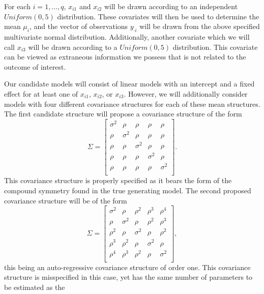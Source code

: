 		For each $i = 1,...,q$, $x_{i1}$ and $x_{i2}$ will be drawn according to an independent $Uniform(0,5)$ distribution. These covariates will then be used to determine the mean
		$\mu_i$, and the vector of observations $y_{\cdot i}$ will be drawn from the above specified multivariate normal distribution. Additionally, another covariate which we will
		call $x_{i3}$ will be drawn according to a $Uniform(0,5)$ distribution. This covariate can be viewed as extraneous information we possess that is not related to the outcome of
		interest. 

		Our candidate models will consist of linear models with an intercept and a fixed effect for at least one of $x_{i1}$, $x_{i2}$, or $x_{i3}$. However, we will additionally consider models
		with four different covariance structures for each of these mean structures. The first candidate structure will propose a covariance structure of the form
		\begin{equation}
			\Sigma = 
			\begin{bmatrix}
				\sigma^2 & \rho & \rho & \rho & \rho \\
				\rho & \sigma^2 & \rho & \rho & \rho \\
				\rho & \rho & \sigma^2 & \rho & \rho \\
				\rho & \rho & \rho & \sigma^2 & \rho \\
				\rho & \rho & \rho & \rho & \sigma^2 \\
			\end{bmatrix}
			.
		\end{equation}
		This covariance structure is properly specified as it bears the form of the compound symmetry found in the true generating model. The second proposed covariance structure will be
		of the form
		\begin{equation}
			\Sigma = 
			\begin{bmatrix}
				\sigma^2 & \rho & \rho^2 & \rho^3 & \rho^4 \\
				\rho & \sigma^2 & \rho & \rho^2 & \rho^3 \\
				\rho^2 & \rho & \sigma^2 & \rho & \rho^2 \\
				\rho^3 & \rho^2 & \rho & \sigma^2 & \rho \\
				\rho^4 & \rho^3 & \rho^2 & \rho & \sigma^2 \\
			\end{bmatrix}
			,
		\end{equation}
		this being an auto-regressive covariance structure of order one. This covariance structure is misspecified in this case, yet has the same number of parameters to be estimated as the
